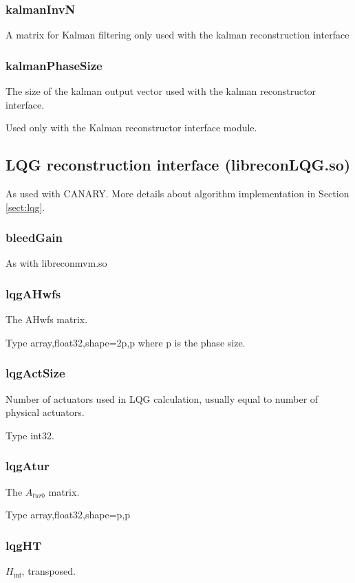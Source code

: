 \documentclass[a4,10pt]{article}
\begin{document}
\subsubsection{kalmanInvN}
A matrix for Kalman filtering only used with the kalman reconstruction interface

\subsubsection{kalmanPhaseSize}
The size of the kalman output vector used with the kalman
reconstructor interface.

Used only with the Kalman reconstructor interface module.

\subsection{LQG reconstruction interface (libreconLQG.so)}
As used with CANARY.  More details about algorithm implementation in
Section \ref{sect:lqg}.

\subsubsection{bleedGain}
As with libreconmvm.so

\subsubsection{lqgAHwfs}
The AHwfs matrix.

Type array,float32,shape=2p,p where p is the phase size.

\subsubsection{lqgActSize}
Number of actuators used in LQG calculation, usually equal to number
of physical actuators.

Type int32.

\subsubsection{lqgAtur}
The $A_{turb}$ matrix.

Type array,float32,shape=p,p

\subsubsection{lqgHT}
$H_{\inf}$, transposed.
\end{document}
